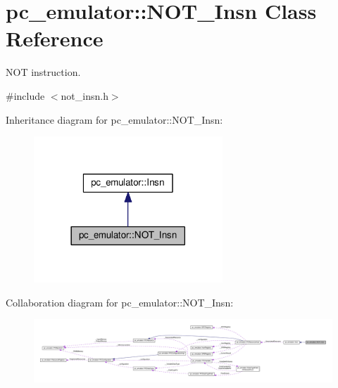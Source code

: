 \hypertarget{classpc__emulator_1_1NOT__Insn}{}\section{pc\+\_\+emulator\+:\+:N\+O\+T\+\_\+\+Insn Class Reference}
\label{classpc__emulator_1_1NOT__Insn}


N\+OT instruction.  




{\ttfamily \#include $<$not\+\_\+insn.\+h$>$}



Inheritance diagram for pc\+\_\+emulator\+:\+:N\+O\+T\+\_\+\+Insn\+:
\nopagebreak
\begin{figure}[H]
\begin{center}
\leavevmode
\includegraphics[width=201pt]{classpc__emulator_1_1NOT__Insn__inherit__graph}
\end{center}
\end{figure}


Collaboration diagram for pc\+\_\+emulator\+:\+:N\+O\+T\+\_\+\+Insn\+:
\nopagebreak
\begin{figure}[H]
\begin{center}
\leavevmode
\includegraphics[width=350pt]{classpc__emulator_1_1NOT__Insn__coll__graph}
\end{center}
\end{figure}
